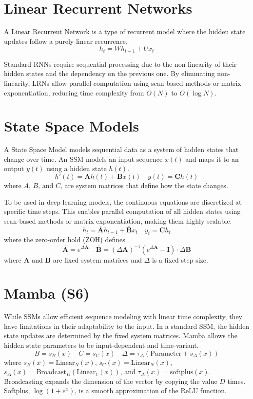 \documentclass{article}
\begin{document}
\section*{Linear Recurrent Networks}

A Linear Recurrent Network is a type of recurrent model where the hidden state updates follow a purely linear recurrence.
\[h_t = Wh_{t-1}+Ux_t\]

Standard RNNs require sequential processing due to the non-linearity of their hidden states and the dependency on the previous one. By eliminating non-linearity, LRNs allow parallel computation using scan-based methods or matrix exponentiation, reducing time complexity from $O(N)$ to $O(\log N)$.

\section*{State Space Models}

A State Space Model models sequential data as a system of hidden states that change over time. An SSM models an input sequence $x(t)$ and maps it to an output $y(t)$ using a hidden state $h(t)$.
\[h'(t)=\mathbf{A}h(t)+\mathbf{B}x(t)\quad y(t)=\mathbf{C}h(t)\]
where $A$, $B$, and $C$, are system matrices that define how the state changes.
\vspace{1em}

To be used in deep learning models, the continuous equations are discretized at specific time steps. This enables parallel computation of all hidden states using scan-based methods or matrix exponentiation, making them highly scalable.
\[h_t=\mathbf{\overline{A}} h_{t-1} + \mathbf{\overline{B}} x_t\quad y_t = \mathbf{C}h_t\]
where the zero-order hold (ZOH) defines
\[\mathbf{\overline{A}}=e^{\Delta \mathbf{A}}\quad \mathbf{\overline{B}}={(\Delta \mathbf{A})}^{-1} (e^{\Delta \mathbf{A}} - \mathbf{I})\cdot \Delta\mathbf{B}\]
where $\mathbf{A}$ and $\mathbf{B}$ are fixed system matrices and $\Delta$ is a fixed step size.

\section*{Mamba (S6)}

While SSMs allow efficient sequence modeling with linear time complexity, they have limitations in their adaptability to the input. In a standard SSM, the hidden state updates are determined by the fixed system matrices. Mamba allows the hidden state parameters to be input-dependent and time-variant.
\[B = s_B (x)\quad C = s_C (x)\quad \Delta = \tau_\Delta (\text{Parameter} + s_\Delta (x))\]
where $s_B(x)=\text{Linear}_N(x)$, $s_C(x)=\text{Linear}_N(x)$, $s_\Delta(x)=\text{Broadcast}_D (\text{Linear}_1 (x))$, and $\tau_\Delta(x) = \text{softplus}(x)$. Broadcasting expands the dimension of the vector by copying the value $D$ times. Softplus, $\log(1+e^x)$, is a smooth approximation of the ReLU function.
\vspace{1em}
\end{document}
